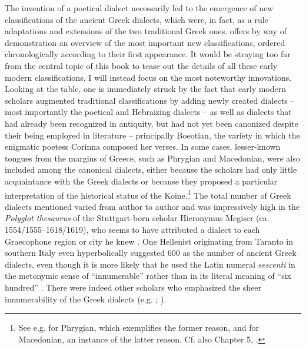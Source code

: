 {The invention of a poetical dialect necessarily led to the emergence of new classifications of the ancient Greek dialects, which were, in fact, as a rule adaptations and extensions of the two traditional Greek ones.  offers by way of demonstration an overview of the most important new classifications, ordered chronologically according to their first appearance. It would be straying too far from the central topic of this book to tease out the details of all these early modern classifications. I will instead focus on the most noteworthy innovations. Looking at the table, one is immediately struck by the fact that early modern scholars augmented traditional classifications by adding newly created dialects – most importantly the poetical and Hebraizing dialects – as well as dialects that had already been recognized in antiquity, but had not yet been canonized despite their being employed in literature – principally Boeotian, the variety in which the enigmatic poetess Corinna composed her verses. In some cases, lesser-known tongues from the margins of Greece, such as Phrygian and Macedonian, were also included among the canonical dialects, either because the scholars had only little acquaintance with the Greek dialects or because they proposed a particular interpretation of the historical status of the Koine.\footnote{See e.g. \citet[131]{Kircher1679} for Phrygian, which exemplifies the former reason, and \citet[\textsc{c.2}\textsc{\textsuperscript{v}}]{Schwartz1702} for Macedonian, an instance of the latter reason. Cf. also Chapter 5, .} The total number of Greek dialects mentioned varied from author to author and was impressively high in the \textit{Polyglot thesaurus} of the Stuttgart-born scholar Hieronymus Megiser (ca. 1554/1555–1618/1619), who seems to have attributed a dialect to each Graecophone region or city he knew \citep[.7\textsc{\textsuperscript{r-v}}]{Megiser1603}. One Hellenist originating from Taranto in southern Italy even hyperbolically suggested 600 as the number of ancient Greek dialects, even though it is more likely that he used the Latin numeral \textit{sescenti} in the metonymic sense of “innumerable” rather than in its literal meaning of “six hundred” \citep[9]{Giovane1589}. There were indeed other scholars who emphasized the sheer innumerability of the Greek dialects (e.g. \citealt[127]{Bischoff1708}; \citealt[196]{Ries1786}).

}
